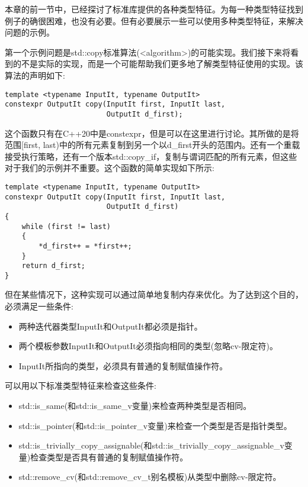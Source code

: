 
本章的前一节中，已经探讨了标准库提供的各种类型特征。为每一种类型特征找到例子的确很困难，也没有必要。但有必要展示一些可以使用多种类型特征，来解决问题的示例。


第一个示例问题是std::copy标准算法(<algorithm>)的可能实现。我们接下来将看到的不是实际的实现，而是一个可能帮助我们更多地了解类型特征使用的实现。该算法的声明如下:

\begin{lstlisting}[style=styleCXX]
template <typename InputIt, typename OutputIt>
constexpr OutputIt copy(InputIt first, InputIt last,
						OutputIt d_first);
\end{lstlisting}

这个函数只有在C++20中是constexpr，但是可以在这里进行讨论。其所做的是将范围[first, last)中的所有元素复制到另一个以d\_first开头的范围内。还有一个重载接受执行策略，还有一个版本std::copy\_if，复制与谓词匹配的所有元素，但这些对于我们的示例并不重要。这个函数的简单实现如下所示:

\begin{lstlisting}[style=styleCXX]
template <typename InputIt, typename OutputIt>
constexpr OutputIt copy(InputIt first, InputIt last,
						OutputIt d_first)
{
	while (first != last)
	{
		*d_first++ = *first++;
	}
	return d_first;
}
\end{lstlisting}

但在某些情况下，这种实现可以通过简单地复制内存来优化。为了达到这个目的，必须满足一些条件:

\begin{itemize}
\item
两种迭代器类型InputIt和OutputIt都必须是指针。

\item
两个模板参数InputIt和OutputIt必须指向相同的类型(忽略cv-限定符)。

\item
InputIt所指向的类型，必须具有普通的复制赋值操作符。
\end{itemize}

可以用以下标准类型特征来检查这些条件:

\begin{itemize}
\item
std::is\_same(和std::is\_same\_v变量)来检查两种类型是否相同。

\item
std::is\_pointer(和std::is\_pointer\_v变量)来检查一个类型是否是指针类型。

\item
std::is\_trivially\_copy\_assignable(和std::is\_trivially\_copy\_assignable\_v变量)检查类型是否具有普通的复制赋值操作符。

\item
std::remove\_cv(和std::remove\_cv\_t别名模板)从类型中删除cv-限定符。
\end{itemize}

